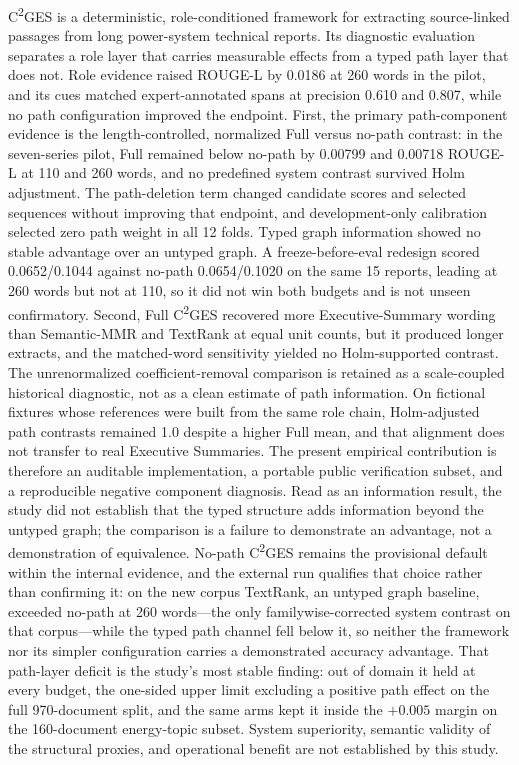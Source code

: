\documentclass[information,article,submit,moreauthors]{Definitions/mdpi}
\newcommand{\cges}{C\textsuperscript{2}GES}
\begin{document}
\cges{} is a deterministic, role-conditioned framework for extracting source-linked passages from long power-system technical reports. Its diagnostic evaluation separates a role layer that carries measurable effects from a typed path layer that does not. Role evidence raised ROUGE-L by 0.0186 at 260 words in the pilot, and its cues matched expert-annotated spans at precision 0.610 and 0.807, while no path configuration improved the endpoint. First, the primary path-component evidence is the length-controlled, normalized Full versus no-path contrast: in the seven-series pilot, Full remained below no-path by 0.00799 and 0.00718 ROUGE-L at 110 and 260 words, and no predefined system contrast survived Holm adjustment. The path-deletion term changed candidate scores and selected sequences without improving that endpoint, and development-only calibration selected zero path weight in all 12 folds. Typed graph information showed no stable advantage over an untyped graph. A freeze-before-eval redesign scored 0.0652/0.1044 against no-path 0.0654/0.1020 on the same 15 reports, leading at 260 words but not at 110, so it did not win both budgets and is not unseen confirmatory. Second, Full \cges{} recovered more Executive-Summary wording than Semantic-MMR and TextRank at equal unit counts, but it produced longer extracts, and the matched-word sensitivity yielded no Holm-supported contrast. The unrenormalized coefficient-removal comparison is retained as a scale-coupled historical diagnostic, not as a clean estimate of path information. On fictional fixtures whose references were built from the same role chain, Holm-adjusted path contrasts remained 1.0 despite a higher Full mean, and that alignment does not transfer to real Executive Summaries. The present empirical contribution is therefore an auditable implementation, a portable public verification subset, and a reproducible negative component diagnosis. Read as an information result, the study did not establish that the typed structure adds information beyond the untyped graph; the comparison is a failure to demonstrate an advantage, not a demonstration of equivalence. No-path \cges{} remains the provisional default within the internal evidence, and the external run qualifies that choice rather than confirming it: on the new corpus TextRank, an untyped graph baseline, exceeded no-path at 260 words---the only familywise-corrected system contrast on that corpus---while the typed path channel fell below it, so neither the framework nor its simpler configuration carries a demonstrated accuracy advantage. That path-layer deficit is the study's most stable finding: out of domain it held at every budget, the one-sided upper limit excluding a positive path effect on the full 970-document split, and the same arms kept it inside the $+0.005$ margin on the 160-document energy-topic subset. System superiority, semantic validity of the structural proxies, and operational benefit are not established by this study.
\end{document}
